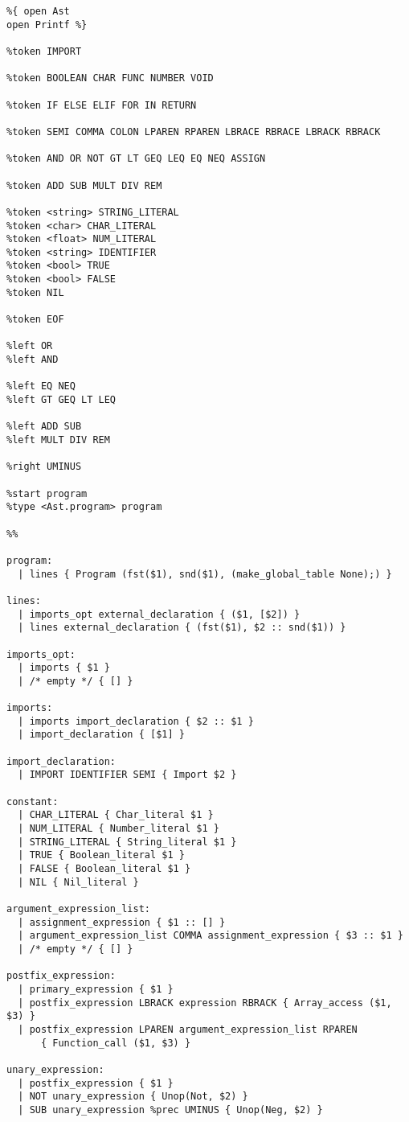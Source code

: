 \begin{verbatim}
%{ open Ast
open Printf %}

%token IMPORT

%token BOOLEAN CHAR FUNC NUMBER VOID

%token IF ELSE ELIF FOR IN RETURN

%token SEMI COMMA COLON LPAREN RPAREN LBRACE RBRACE LBRACK RBRACK

%token AND OR NOT GT LT GEQ LEQ EQ NEQ ASSIGN

%token ADD SUB MULT DIV REM

%token <string> STRING_LITERAL
%token <char> CHAR_LITERAL
%token <float> NUM_LITERAL
%token <string> IDENTIFIER
%token <bool> TRUE
%token <bool> FALSE
%token NIL

%token EOF

%left OR
%left AND

%left EQ NEQ
%left GT GEQ LT LEQ

%left ADD SUB
%left MULT DIV REM

%right UMINUS

%start program
%type <Ast.program> program

%%

program:
  | lines { Program (fst($1), snd($1), (make_global_table None);) }

lines:
  | imports_opt external_declaration { ($1, [$2]) }
  | lines external_declaration { (fst($1), $2 :: snd($1)) }

imports_opt:
  | imports { $1 }
  | /* empty */ { [] }

imports:
  | imports import_declaration { $2 :: $1 }
  | import_declaration { [$1] }

import_declaration:
  | IMPORT IDENTIFIER SEMI { Import $2 }

constant:
  | CHAR_LITERAL { Char_literal $1 }
  | NUM_LITERAL { Number_literal $1 }
  | STRING_LITERAL { String_literal $1 }
  | TRUE { Boolean_literal $1 }
  | FALSE { Boolean_literal $1 }
  | NIL { Nil_literal }

argument_expression_list:
  | assignment_expression { $1 :: [] }
  | argument_expression_list COMMA assignment_expression { $3 :: $1 }
  | /* empty */ { [] }

postfix_expression:
  | primary_expression { $1 }
  | postfix_expression LBRACK expression RBRACK { Array_access ($1, $3) }
  | postfix_expression LPAREN argument_expression_list RPAREN
      { Function_call ($1, $3) }

unary_expression:
  | postfix_expression { $1 }
  | NOT unary_expression { Unop(Not, $2) }
  | SUB unary_expression %prec UMINUS { Unop(Neg, $2) }


\end{verbatim}

